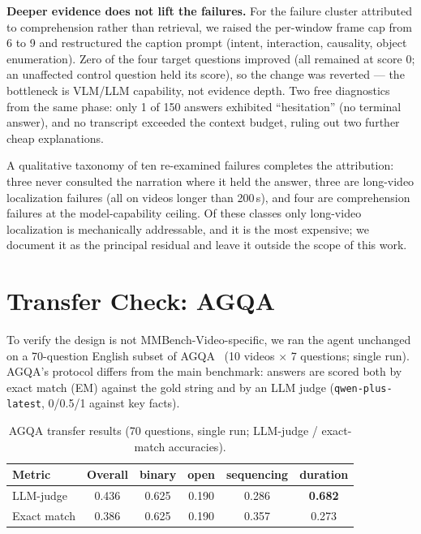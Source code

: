 \textbf{Deeper evidence does not lift the failures.} For the failure cluster
attributed to comprehension rather than retrieval, we raised the per-window frame
cap from 6 to 9 and restructured the caption prompt (intent, interaction,
causality, object enumeration). Zero of the four target questions improved (all
remained at score 0; an unaffected control question held its score), so the change
was reverted --- the bottleneck is VLM/LLM capability, not evidence depth.
Two free diagnostics from the same phase: only 1 of 150 answers exhibited
``hesitation'' (no terminal answer), and no transcript exceeded the context budget,
ruling out two further cheap explanations.

A qualitative taxonomy of ten re-examined failures completes the attribution:
three never consulted the narration where it held the answer, three are long-video
localization failures (all on videos longer than 200\,s), and four are
comprehension failures at the model-capability ceiling. Of these classes only
long-video localization is mechanically addressable, and it is the most expensive;
we document it as the principal residual and leave it outside the scope of this
work.

\section{Transfer Check: AGQA}
\label{sec:agqa}

To verify the design is not MMBench-Video-specific, we ran the agent unchanged on a
70-question English subset of AGQA~\cite{grundemclaughlin2021agqa} (10 videos
$\times$ 7 questions; single run). AGQA's protocol differs from the main benchmark:
answers are scored both by exact match (EM) against the gold string and by an LLM
judge (\texttt{qwen-plus-latest}, 0/0.5/1 against key facts).

\begin{table}[t]
  \centering
  \small
  \caption{AGQA transfer results (70 questions, single run; LLM-judge / exact-match
  accuracies).}
  \label{tab:agqa}
  \begin{tabular}{@{}lccccc@{}}
    \toprule
    Metric & Overall & binary & open & sequencing & duration \\
    \midrule
    LLM-judge & 0.436 & 0.625 & 0.190 & 0.286 & \textbf{0.682} \\
    Exact match & 0.386 & 0.625 & 0.190 & 0.357 & 0.273 \\
    \bottomrule
  \end{tabular}
\end{table}

